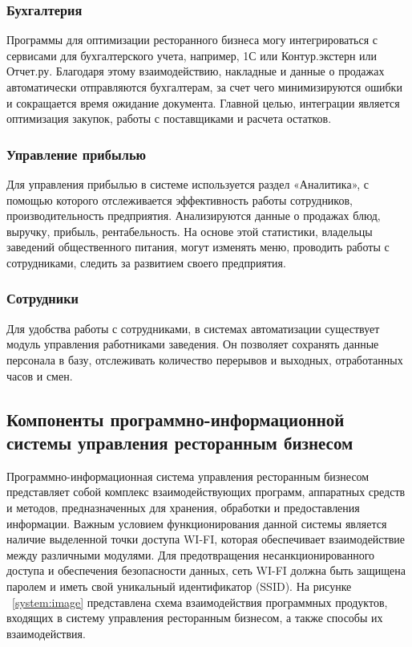 \subsubsection{Бухгалтерия}
Программы для оптимизации ресторанного бизнеса могу интегрироваться с сервисами для бухгалтерского учета, например, 1С или Контур.экстерн или Отчет.ру. Благодаря этому взаимодействию, накладные и данные о продажах автоматически отправляются бухгалтерам, за счет чего минимизируются ошибки и сокращается время ожидание документа. Главной целью, интеграции является оптимизация закупок, работы с поставщиками и расчета остатков.

\subsubsection{Управление прибылью}
Для управления прибылью в системе используется раздел «Аналитика», с помощью которого отслеживается эффективность работы сотрудников, производительность предприятия. Анализируются данные о продажах блюд, выручку, прибыль, рентабельность. На основе этой статистики, владельцы заведений общественного питания, могут изменять меню, проводить работы с сотрудниками, следить за развитием своего предприятия. 

\subsubsection{Сотрудники} 
Для удобства работы с сотрудниками, в системах автоматизации существует модуль управления работниками заведения. Он позволяет сохранять данные персонала в базу, отслеживать количество перерывов и выходных, отработанных часов и смен.


\subsection{Компоненты программно-информационной системы управления ресторанным бизнесом}
Программно-информационная система управления ресторанным бизнесом представляет собой комплекс взаимодействующих программ, аппаратных средств и методов, предназначенных для хранения, обработки и предоставления информации. Важным условием функционирования данной системы является наличие выделенной точки доступа WI-FI, которая обеспечивает взаимодействие между различными модулями. Для предотвращения несанкционированного доступа и обеспечения безопасности данных, сеть WI-FI должна быть защищена паролем и иметь свой уникальный идентификатор (SSID). 
На рисунке ~\ref{system:image} представлена схема взаимодействия программных продуктов, входящих в систему управления ресторанным бизнесом, а также способы их взаимодействия.

